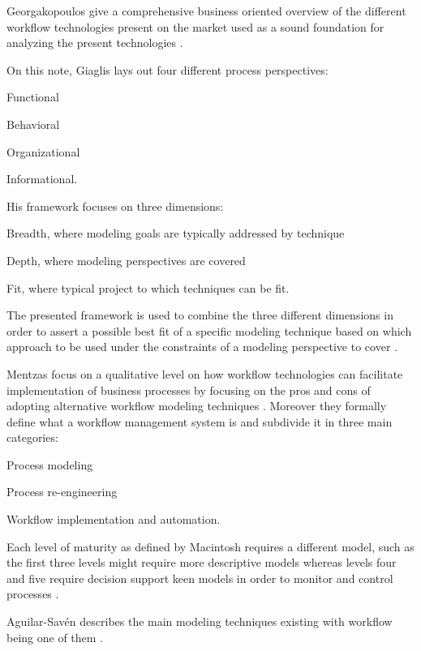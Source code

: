 \documentclass{seal_thesis}
\begin{document}
Georgakopoulos \etal give a comprehensive business oriented overview of the different workflow technologies present on the market used as a sound foundation for analyzing the present technologies \cite{Georgakopoulos1995}.

On this note, Giaglis lays out four different process perspectives:
\begin{enumerate*}
	\item Functional
	\item Behavioral
	\item Organizational
	\item Informational.
\end{enumerate*}

His framework focuses on three dimensions:
\begin{enumerate*}
	\item Breadth, where modeling goals are typically addressed by technique
	\item Depth, where modeling perspectives are covered
	\item Fit, where typical project to which techniques can be fit.
\end{enumerate*}

The presented framework is used to combine the three different dimensions in order to assert a possible best fit of a specific modeling technique based on which approach to be used under the constraints of a modeling perspective to cover \cite{Giaglis2001}.

Mentzas \etal focus on a qualitative level on how workflow technologies can facilitate implementation of business processes by focusing on the pros and cons of adopting alternative workflow modeling techniques \cite{Mentzas2001}. Moreover they formally define what a workflow management system is and subdivide it in three main categories:
\begin{enumerate*}
	\item Process modeling
	\item Process re-engineering
	\item Workflow implementation and automation.
\end{enumerate*}

Each level of maturity as defined by Macintosh requires a different model, such as the first three levels might require more descriptive models whereas levels four and five require decision support keen models in order to monitor and control processes \cite{Mentzas2001}.

Aguilar-Sav\'{e}n describes the main modeling techniques existing with workflow being one of them \cite{Aguilar-Saven2004}.
\end{document}
